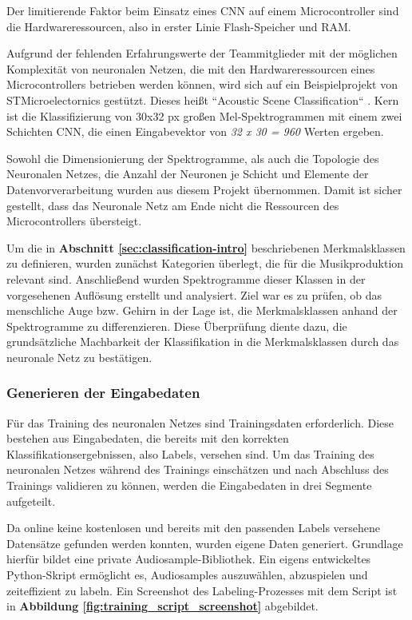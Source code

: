 Der limitierende Faktor beim Einsatz eines CNN auf einem Microcontroller sind die Hardwareressourcen, also in erster Linie Flash-Speicher und RAM.

Aufgrund der fehlenden Erfahrungswerte der Teammitglieder mit der möglichen Komplexität von neuronalen Netzen, die mit den Hardwareressourcen eines Microcontrollers betrieben werden können, wird sich auf ein Beispielprojekt von STMicroelectornics gestützt. Dieses heißt ``Acoustic Scene Classification`` \cite{stm-asc}\cite{stm-asc-2}. Kern ist die Klassifizierung von 30x32 px großen Mel-Spektrogrammen mit einem zwei Schichten CNN, die einen Eingabevektor von \textit{32 x 30 = 960} Werten ergeben. 

Sowohl die Dimensionierung der Spektrogramme, als auch die Topologie des Neuronalen Netzes, die Anzahl der Neuronen je Schicht und Elemente der Datenvorverarbeitung wurden aus diesem Projekt übernommen. Damit ist sicher gestellt, dass das Neuronale Netz am Ende nicht die Ressourcen des Microcontrollers übersteigt.

Um die in \textbf{Abschnitt \ref{sec:classification-intro}} beschriebenen Merkmalsklassen zu definieren, wurden zunächst Kategorien überlegt, die für die Musikproduktion relevant sind. Anschließend wurden Spektrogramme dieser Klassen in der vorgesehenen Auflösung erstellt und analysiert. Ziel war es zu prüfen, ob das menschliche Auge bzw. Gehirn in der Lage ist, die Merkmalsklassen anhand der Spektrogramme zu differenzieren. Diese Überprüfung diente dazu, die grundsätzliche Machbarkeit der Klassifikation in die Merkmalsklassen durch das neuronale Netz zu bestätigen.


\subsubsection{Generieren der Eingabedaten}
\label{sec:input-data-generation}
Für das Training des neuronalen Netzes sind Trainingsdaten erforderlich. Diese bestehen aus Eingabedaten, die bereits mit den korrekten Klassifikationsergebnissen, also Labels, versehen sind. Um das Training des neuronalen Netzes während des Trainings einschätzen und nach Abschluss des Trainings validieren zu können, werden die Eingabedaten in drei Segmente aufgeteilt.

Da online keine kostenlosen und bereits mit den passenden Labels versehene Datensätze gefunden werden konnten, wurden eigene Daten generiert. Grundlage hierfür bildet eine private Audiosample-Bibliothek. Ein eigens entwickeltes Python-Skript ermöglicht es, Audiosamples auszuwählen, abzuspielen und zeiteffizient zu labeln. Ein Screenshot des Labeling-Prozesses mit dem Script ist in \textbf{Abbildung \ref{fig:training_script_screenshot}} abgebildet.

